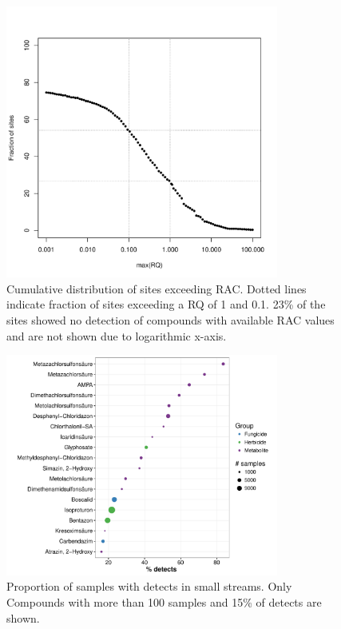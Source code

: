 \documentclass[pdftex,a4paper]{scrreprt}
\begin{document}
\begin{figure}[ht]
	\centering
	\includegraphics[width = 0.8\textwidth]{prac_ex}
	\caption[Cumulative distribution of the number sites exceeding RAC.]{Cumulative distribution of sites exceeding RAC. Dotted lines indicate fraction of sites exceeding a RQ of 1 and 0.1. 23\% of the sites showed no detection of compounds with available RAC values and are not shown due to logarithmic x-axis.}
	\label{fig:prac_ex}
\end{figure}


\begin{figure}[ht]
	\centering
	\includegraphics[width = 0.8\textwidth]{pdetects}
	\caption[Proportion of samples with detects in small streams.]{Proportion of samples with detects in small streams. Only Compounds with more than 100 samples and 15\% of detects are shown.}
	\label{fig:pdetects}
\end{figure}
\end{document}
